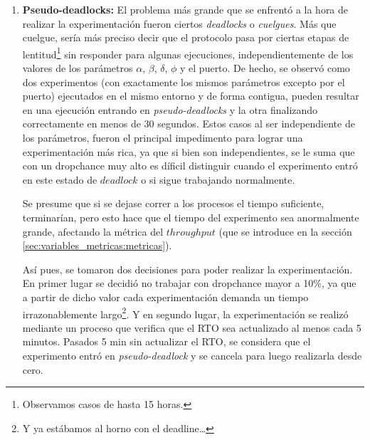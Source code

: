 \begin{enumerate}[label=(\alph*)]
        \par Sobre este caso, esta disertaci\'on se di\'o demasiado cerca de la
        fecha de
        entrega\footnote{\url{http://www.memecreator.org/static/images/memes/2739987.jpg}},
        con lo cual se decidi\'o documentar dicho comportamiento pero procesar
        los datos tal como se obtuvieron de la experimentaci\'on. Esto lleva a
        que, en lo que sigue de este trabajo, cuando hablemos de un delay
        $\delta$, en la realidad este represent\'o un delay de $2\delta$.

    \bigskip 
    \item \textbf{Pseudo-deadlocks:} El problema m\'as grande que se enfrent\'o
        a la hora de realizar la experimentaci\'on fueron ciertos
        \emph{deadlocks} o \emph{cuelgues}. M\'as que cuelgue, ser\'ia m\'as
        preciso decir que el protocolo pasa por ciertas etapas de
        lentitud\footnote{Observamos casos de hasta 15 horas.} sin responder
        para algunas ejecuciones, independientemente de los valores de los
        par\'ametros $\alpha$, $\beta$, $\delta$, $\phi$ y el puerto. De hecho,
        se observ\'o como dos experimentos (con exactamente los mismos
        par\'ametros excepto por el puerto) ejecutados en el mismo entorno y de
        forma contigua, pueden resultar en una ejecuci\'on entrando en
        \emph{pseudo-deadlocks} y la otra finalizando correctamente en menos de
        30 segundos. Estos casos al ser independiente de los par\'ametros,
        fueron el principal impedimento para lograr una experimentaci\'on m\'as
        rica, ya que si bien son independientes, se le suma que con un
        dropchance muy alto es d\'ificil distinguir cuando el experimento
        entr\'o en este estado de $deadlock$ o si sigue trabajando normalmente.

        \par Se presume que si se dejase correr a los procesos el tiempo
        suficiente, terminar\'ian, pero esto hace que el tiempo del experimento
        sea anormalmente grande, afectando la m\'etrica del $throughput$ (que se
        introduce en la secci\'on \ref{sec:variables_metricas:metricas}).

        \par As\'i pues, se tomaron dos decisiones para poder realizar la
        experimentaci\'on. En primer lugar se decidi\'o no trabajar con
        dropchance mayor a 10\%, ya que a partir de dicho valor cada
        experimentaci\'on demanda un tiempo irrazonablemente largo\footnote{Y ya
        est\'abamos al horno con el deadline\ldots}. Y en segundo lugar, la
        experimentaci\'on se realiz\'o mediante un proceso que verifica que el
        RTO sea actualizado al menos cada 5 minutos. Pasados 5 min sin actualizar
        el RTO, se considera que el experimento entr\'o en
        \emph{pseudo-deadlock} y se cancela para luego realizarla desde cero.

\end{enumerate}
